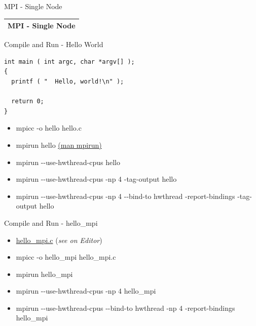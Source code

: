\documentclass[ignorenonframetext,]{beamer}
\providecommand{\tightlist}{%
  \setlength{\itemsep}{0pt}\setlength{\parskip}{0pt}}
\begin{document}
\begin{frame}{MPI - Single Node}

\begin{longtable}[]{@{}l@{}}
\toprule
\endhead
MPI - Single Node\tabularnewline
\bottomrule
\end{longtable}

\end{frame}

\begin{frame}[fragile]{Compile and Run - Hello World}

\begin{verbatim}
int main ( int argc, char *argv[] );
{
  printf ( "  Hello, world!\n" );

  return 0;
}

\end{verbatim}

\begin{itemize}
\tightlist
\item
  mpicc -o hello hello.c
\item
  mpirun hello \href{https://linux.die.net/man/1/mpirun}{(man mpirun)}
\item
  mpirun -\/-use-hwthread-cpus hello
\item
  mpirun -\/-use-hwthread-cpus -np 4 -tag-output hello
\item
  mpirun -\/-use-hwthread-cpus -np 4 -\/-bind-to hwthread
  -report-bindings -tag-output hello
\end{itemize}


\end{frame}

\begin{frame}{Compile and Run - hello\_mpi}

\begin{itemize}
\item
  \url{hello_mpi.c} (\emph{see on Editor})
\item
  mpicc -o hello\_mpi hello\_mpi.c
\item
  mpirun hello\_mpi
\item
  mpirun -\/-use-hwthread-cpus -np 4 hello\_mpi
\item
  mpirun -\/-use-hwthread-cpus -\/-bind-to hwthread -np 4
  -report-bindings hello\_mpi
\end{itemize}


\end{frame}
\end{document}
